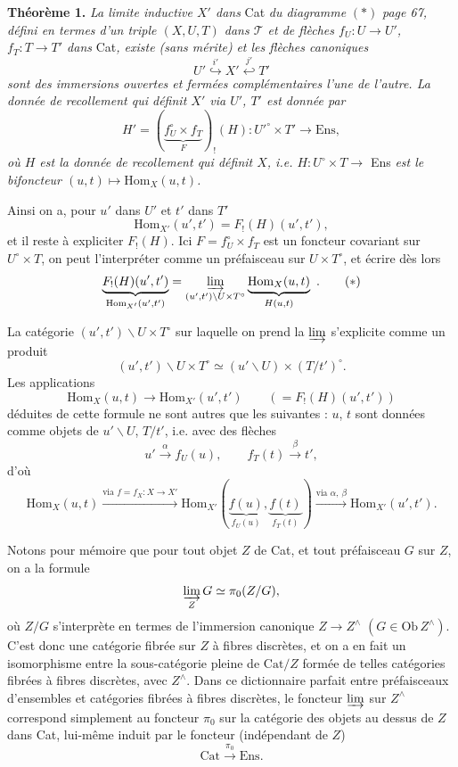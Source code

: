 \documentclass[11pt]{article}
\newcommand{\printedpage}[1]{\marginpar{\footnotesize p.~#1}}
\newcommand{\msp}[1]{\marginpar{\footnotesize [#1]}}
\newcommand{\Hom}{\mathrm{Hom}}
\newcommand{\Cat}{\mathrm{Cat}}
\newcommand{\Ens}{\mathrm{Ens}}
\newcommand{\Ob}{\mathrm{Ob}\,}
\begin{document}
\textbf{Théorème 1.} \textit{La limite inductive $X'$ dans} Cat \textit{du diagramme} $(*)$ \textit{page 67, défini en termes d'un triple $(X,U,T)$ dans $\mathcal{T}$ et de flèches $f_U : U\longrightarrow U'$, $f_T : T\longrightarrow T'$ dans} Cat\textit{, existe (sans mérite)} \msp{page 70} \textit{et les flèches canoniques}
\[
U' \overset{i'}{\hookrightarrow} X' \overset{j'}{\hookleftarrow} T'
\]
\textit{sont des immersions ouvertes et fermées complémentaires l'une de l'autre. La donnée de recollement qui définit $X'$ via $U'$, $T'$ est donnée par}
\[
H' = (\underbrace{f_U^{\circ}\times f_T}_{F})_{!}(H) : U'^{\circ}\times T' \longrightarrow \Ens,
\]
\textit{où $H$ est la donnée de recollement qui définit $X$, i.e. $H : U^{\circ}\times T\longrightarrow$} Ens \textit{est le bifoncteur $(u,t)\longmapsto \Hom_X(u,t)$.}

Ainsi on a, pour $u'$ dans $U'$ et $t'$ dans $T'$
\[
\Hom_{X'}(u',t') = F_{!}(H)(u',t'),
\]
et il reste à expliciter $F_{!}(H)$. Ici $F=f_U^{\circ}\times f_T$ est un foncteur covariant sur $U^{\circ}\times T$, on peut l'interpréter comme un préfaisceau sur $U\times T^{\circ}$, et écrire dès lors
\[
\underbrace{F_{!}(H)(u',t')}_{\Hom_{X'}(u',t')} = \varinjlim_{(u',t')\backslash U\times T^{\circ}} \underbrace{\Hom_X(u,t)}_{H(u,t)} \ .
\tag*{$(*)$}
\]

\printedpage{51}
La catégorie $(u',t')\backslash U\times T^{\circ}$ sur laquelle on prend la $\varinjlim$ s'explicite comme un produit
\[
(u',t')\backslash U\times T^{\circ} \simeq (u'\backslash U)\times(T/t')^{\circ}.
\]
Les applications
\[
\Hom_X(u,t)\longrightarrow \Hom_{X'}(u',t') \qquad (=F_{!}(H)(u',t'))
\]
\msp{page 71} déduites de cette formule ne sont autres que les suivantes : $u$, $t$ sont données comme objets de $u'\backslash U$, $T/t'$, i.e. avec des flèches
\[
u'\xrightarrow{\alpha} f_U(u), \qquad f_T(t)\xrightarrow{\beta} t',
\]
d'où
\[
\Hom_X(u,t) \xrightarrow{\text{via } f=f_X:X\to X'} \Hom_{X'}(\underbrace{f(u)}_{f_U(u)},\underbrace{f(t)}_{f_T(t)}) \xrightarrow{\text{via } \alpha,\ \beta} \Hom_{X'}(u',t').
\]

Notons pour mémoire que pour tout objet $Z$ de Cat, et tout préfaisceau $G$ sur $Z$, on a la formule
\[
\varinjlim_{Z} G \simeq \pi_0(Z/G),
\]
où $Z/G$ s'interprète en termes de l'immersion canonique $Z\longrightarrow Z^{\wedge}$ $(G\in \Ob Z^{\wedge})$. C'est donc une catégorie fibrée sur $Z$ à fibres discrètes, et on a en fait un isomorphisme entre la sous-catégorie pleine de $\Cat/Z$ formée de telles catégories fibrées à fibres discrètes, avec $Z^{\wedge}$. Dans ce dictionnaire parfait entre préfaisceaux d'ensembles et catégories fibrées à fibres discrètes, le foncteur $\varinjlim$ sur $Z^{\wedge}$ correspond simplement au foncteur $\pi_0$ sur la catégorie des objets au dessus de $Z$ dans Cat, lui-même induit par le foncteur (indépendant de $Z$)
\[
\Cat \xrightarrow{\pi_0} \Ens.
\]
\end{document}
